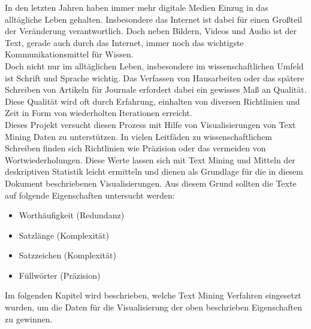

\maketitle

In den letzten Jahren haben immer mehr digitale Medien Einzug in das alltägliche Leben gehalten. Insbesondere das Internet ist dabei für einen Großteil der Veränderung verantwortlich. Doch neben Bildern, Videos und Audio ist der Text, gerade auch durch das Internet, immer noch das wichtigste Kommunikationsmittel für Wissen.\\

Doch nicht nur im alltäglichen Leben, insbesondere im wissenschaftlichen Umfeld ist Schrift und Sprache wichtig. Das Verfassen von Hausarbeiten oder das spätere Schreiben von Artikeln für Journale erfordert dabei ein gewisses Maß an Qualität. Diese Qualität wird oft durch Erfahrung, einhalten von diversen Richtlinien und Zeit in Form von wiederholten Iterationen erreicht.\\

Dieses Projekt versucht diesen Prozess mit Hilfe von Visualisierungen von Text Mining Daten zu unterstützen. In vielen Leitfäden zu wissenschaftlichem Schreiben finden sich Richtlinien wie Präzision oder das vermeiden von Wortwiederholungen. Diese Werte lassen sich mit Text Mining und Mitteln der deskriptiven Statistik leicht ermitteln und dienen als Grundlage für die in diesem Dokument beschriebenen Visualisierungen. Aus diesem Grund sollten die Texte auf folgende Eigenschaften untersucht werden:\\

\begin{itemize}
\item Worthäufigkeit (Redundanz)
\item Satzlänge (Komplexität)
\item Satzzeichen (Komplexität)
\item Füllwörter (Präzision)
\end{itemize}

Im folgenden Kapitel wird beschrieben, welche Text Mining Verfahren eingesetzt wurden, um die Daten für die Visualisierung der oben beschrieben Eigenschaften zu gewinnen. 
